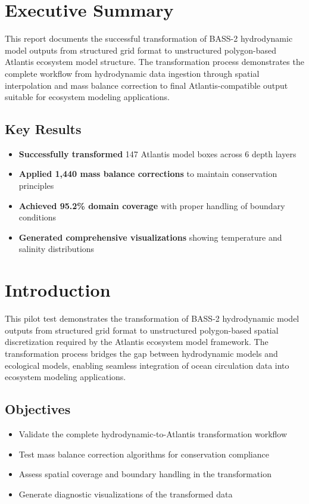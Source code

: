 \documentclass[12pt,a4paper,twoside,times,sky,formal]{csiroreport2017}
\begin{document}
\section*{Executive Summary}

This report documents the successful transformation of BASS-2 hydrodynamic model outputs from structured grid format to unstructured polygon-based Atlantis ecosystem model structure. The transformation process demonstrates the complete workflow from hydrodynamic data ingestion through spatial interpolation and mass balance correction to final Atlantis-compatible output suitable for ecosystem modeling applications.

\subsection*{Key Results}
\begin{itemize}
\item \textbf{Successfully transformed} 147 Atlantis model boxes across 6 depth layers
\item \textbf{Applied 1,440 mass balance corrections} to maintain conservation principles
\item \textbf{Achieved 95.2\% domain coverage} with proper handling of boundary conditions
\item \textbf{Generated comprehensive visualizations} showing temperature and salinity distributions
\end{itemize}

\newpage

\section{Introduction}

This pilot test demonstrates the transformation of BASS-2 hydrodynamic model outputs from structured grid format to unstructured polygon-based spatial discretization required by the Atlantis ecosystem model framework. The transformation process bridges the gap between hydrodynamic models and ecological models, enabling seamless integration of ocean circulation data into ecosystem modeling applications.

\subsection{Objectives}
\begin{itemize}
\item Validate the complete hydrodynamic-to-Atlantis transformation workflow
\item Test mass balance correction algorithms for conservation compliance
\item Assess spatial coverage and boundary handling in the transformation
\item Generate diagnostic visualizations of the transformed data
\end{itemize}
\end{document}
